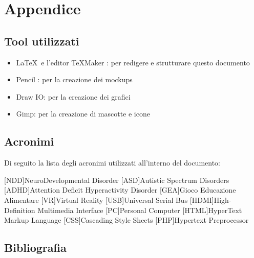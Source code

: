 \section{Appendice} \label{sec:app}

\subsection{Tool utilizzati} \label{subsec:tool}

\begin{itemize}
	\item \LaTeX\ e l'editor TeXMaker : per redigere e strutturare questo documento
	\item Pencil : per la creazione dei mockups
	\item Draw IO: per la creazione dei grafici
	\item Gimp: per la creazione di mascotte e icone
\end{itemize}

\subsection{Acronimi} \label{acr}
Di seguito la lista degli acronimi utilizzati all'interno del documento:

\begin{acronym}[NDD] %

[NDD]{NeuroDevelopmental Disorder}
[ASD]{Autistic Spectrum Disorders}
[ADHD]{Attention Deficit Hyperactivity Disorder}
[GEA]{Gioco Educazione Alimentare}
[VR]{Virtual Reality}
[USB]{Universal Serial Bus}
[HDMI]{High-Definition Multimedia Interface}
[PC]{Personal Computer}
[HTML]{HyperText Markup Language}
[CSS]{Cascading Style Sheets}
[PHP]{Hypertext Preprocessor}


\end{acronym}

\subsection{Bibliografia} \label{subsec:biblio}